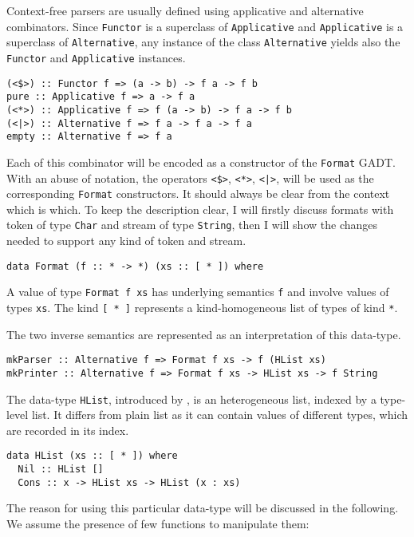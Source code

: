 \documentclass[../Thesis.tex]{subfiles}
\begin{document}
Context-free parsers are usually defined using applicative 
and alternative combinators. Since \texttt{Functor} is a superclass of \texttt{Applicative} and \texttt{Applicative} is a superclass of \texttt{Alternative}, any instance of the class \texttt{Alternative} yields
also the \texttt{Functor} and \texttt{Applicative} instances.

\begin{verbatim}
(<$>) :: Functor f => (a -> b) -> f a -> f b
pure :: Applicative f => a -> f a
(<*>) :: Applicative f => f (a -> b) -> f a -> f b
(<|>) :: Alternative f => f a -> f a -> f a
empty :: Alternative f => f a
\end{verbatim} 


Each of this combinator will be encoded as a constructor of the \texttt{Format} GADT. With an abuse of notation, the operators \texttt{<\$>}, \texttt{<*>}, \texttt{<|>}, will be used as the corresponding \texttt{Format} constructors. 
It should always be clear from the context which is which. 
To keep the description clear, I will firstly discuss formats with token of type \texttt{Char} and stream of type \texttt{String}, then I will show the changes needed to support any kind of token and stream.

\begin{verbatim}
data Format (f :: * -> *) (xs :: [ * ]) where
\end{verbatim}

A value of type \texttt{Format f xs} has underlying semantics \texttt{f} and involve values of types \texttt{xs}. The kind \texttt{[ * ]} represents a kind-homogeneous list of types of kind \texttt{*}.

The two inverse semantics are represented as an interpretation of this data-type.
\begin{verbatim}
mkParser :: Alternative f => Format f xs -> f (HList xs)
mkPrinter :: Alternative f => Format f xs -> HList xs -> f String
\end{verbatim}

The data-type \texttt{HList}, introduced by \cite{Kiselyov04stronglytyped}, is an heterogeneous list, indexed by a type-level list. It differs from plain list as it can contain values of different types, which are recorded in its index.
\begin{verbatim}
data HList (xs :: [ * ]) where
  Nil :: HList [] 
  Cons :: x -> HList xs -> HList (x : xs) 
\end{verbatim}

The reason for using this particular data-type will be discussed in the following. We assume the presence of few functions to manipulate them:
\end{document}
